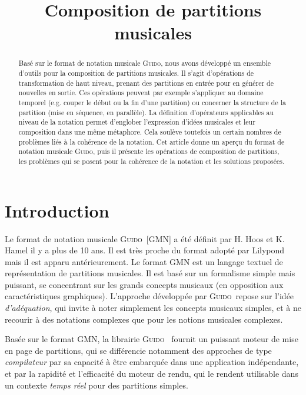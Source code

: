 \documentclass{article}
\title{Composition de partitions musicales}
\newcommand{\Guido}		{\textsc{Guido}}
\begin{document}
%
\maketitle
%
\begin{abstract}
Basé sur le format de notation musicale \Guido , nous avons développé un ensemble d'outils pour la composition de partitions musicales. Il s'agit d'opérations de transformation de haut niveau, prenant des partitions en entrée pour en générer de nouvelles  en sortie. Ces opérations peuvent par exemple s'appliquer au domaine temporel (e.g. couper le début ou la fin d'une partition) ou concerner la structure de la partition (mise en séquence, en parallèle).
La définition d'opérateurs applicables au niveau de la notation permet d'englober l'expression d'idées musicales et leur composition dans une même métaphore. Cela soulève toutefois un certain nombres de problèmes liés à la cohérence de la notation.
Cet article donne un aperçu du format de notation musicale \Guido , puis il présente les opérations de composition de partitions, les problèmes qui se posent pour la cohérence de la notation et les solutions proposées.
\end{abstract}

\section{Introduction}\label{sec:intro}
Le format de notation musicale \Guido\ [GMN] \cite{hoos98} \cite{guido} a été définit par H. Hoos et K. Hamel il y a plus de 10 ans.
Il est très proche du format adopté par Lilypond \cite{lilypond03} \cite{lilypond06} mais il est apparu antérieurement.
Le format GMN est un langage textuel de représentation de partitions musicales. Il est basé sur un formalisme simple mais puissant, se concentrant sur les grands concepts musicaux (en opposition aux caractéristiques graphiques). L'approche développée par \Guido\ repose sur l'idée \emph{d'adéquation}, qui invite à noter simplement les concepts musicaux simples, et à ne recourir à des notations complexes que pour les notions musicales complexes.

Basée sur le format GMN, la librairie \Guido\ \cite{daudin09a,Fober:04b} fournit un puissant moteur de mise en page de partitions, qui se différencie notamment des approches de type \emph{compilateur}  \cite{lilypond03,musixtex} par sa capacité à être embarquée dans une application indépendante, et par la rapidité et l'efficacité du moteur de rendu, qui le rendent utilisable dans un contexte \emph{temps réel} pour des partitions simples.
\end{document}
